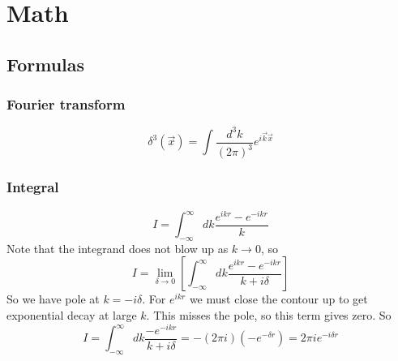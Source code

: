 \chapter{Math}

\section{Formulas}

\subsection{Fourier transform}
\[\delta^3(\vec{x})=\int\frac{d^3k}{(2\pi)^3}e^{i\vec{k}\vec{x}}\]

\subsection{Integral}
\[I=\int_{-\infty}^{\infty}dk\frac{e^{ikr}-e^{-ikr}}{k}\]
Note that the integrand does not blow up as $k \rightarrow 0$, so
\[I=\displaystyle\lim_{\delta\rightarrow{0}}\left[\int_{-\infty}^{\infty}dk\frac{e^{ikr}-e^{-ikr}}{k+i\delta}\right]\]
So we have pole at $k = -i\delta$. For $e^{ikr}$ we must close the contour
up to get exponential decay at large $\mathit{k}$. This misses the pole, so
this term gives zero. So
\[I=\int_{-\infty}^{\infty}dk\frac{-e^{-ikr}}{k+i\delta}=-(2\pi{i})(-e^{-\delta{r}})=2\pi{i}e^{-i\delta{r}}\]
